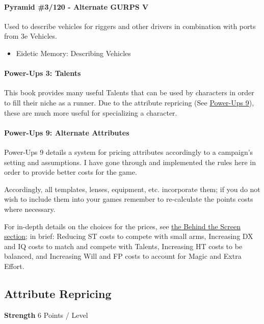 \begin{multicols*}{3}
	\paragraph{\GURPS Pyramid \#3/120 - Alternate GURPS V}
	Used to describe vehicles for riggers and other drivers in combination with ports from \GURPS 3e Vehicles.
	
	\begin{itemize}
		\itemsep 0pt
		\item Eidetic Memory: Describing Vehicles
	\end{itemize}
	
	\paragraph{\GURPS Power-Ups 3: Talents}
	This book provides many useful Talents that can be used by characters in order to fill their niche as a runner. Due to the attribute repricing (See \hyperref[PU9]{Power-Ups 9}), these are much more useful for specializing a character.
	
	\paragraph{\GURPS Power-Ups 9: Alternate Attributes \label{PU9}}
	\GURPS Power-Ups 9 details a system for pricing attributes accordingly to a campaign's setting and assumptions. I have gone through and implemented the rules here in order to provide better costs for the game. 
	
	Accordingly, all templates, lenses, equipment, etc. incorporate them; if you do not wish to include them into your games remember to re-calculate the points costs where necessary.
	
	For in-depth details on the choices for the prices, see \hyperref[behind_the_screen]{the Behind the Screen section}; in brief: Reducing ST costs to compete with small arms, Increasing DX and IQ costs to match and compete with Talents, Increasing HT costs to be balanced, and Increasing Will and FP costs to account for Magic and Extra Effort.
	
	\begin{coloredbox}
		
	\subsection*{Attribute Repricing}
	\raggedright
	
	\noindent\textbf{Strength}
	6 Points / Level
	

\end{coloredbox}
\end{multicols*}
